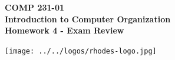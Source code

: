 \documentclass[10pt]{article}
\begin{document}

\hspace{-5mm}
\begin{minipage}{0.65\linewidth}
  \textbf{
      \hspace{-3mm}
      {\Large COMP 231-01}\\
      {\Large Introduction to Computer Organization}\\
      {\Large Homework 4 - Exam Review}}
\end{minipage}
\begin{minipage}{0.35\linewidth}
  \texttt{[image: ../../logos/rhodes-logo.jpg]}
\end{minipage}

\\
\end{document}
